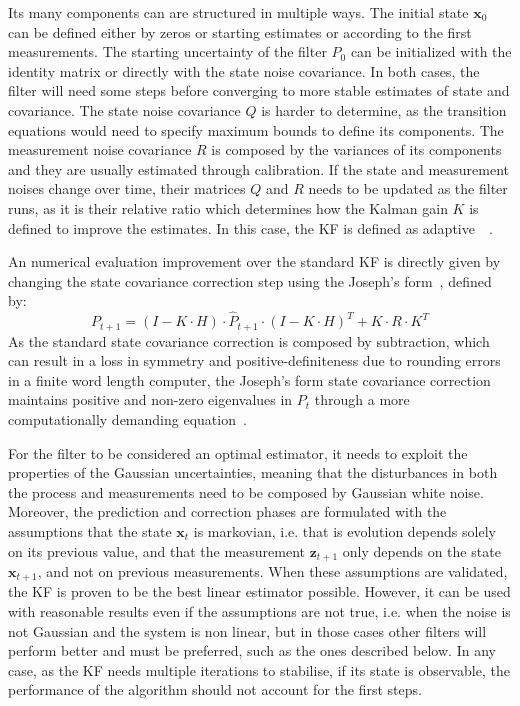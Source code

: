 Its many components can are structured in multiple ways.
The initial state $\mathbf{x}_{0}$ can be defined either by zeros or starting estimates or according to the first measurements.
The starting uncertainty of the filter $P_0$ can be initialized with the identity matrix or directly with the state noise covariance. In both cases, the filter will need some steps before converging to more stable estimates of state and covariance.
The state noise covariance $Q$ is harder to determine, as the transition equations would need to specify maximum bounds to define its components.
The measurement noise covariance $R$ is composed by the variances of its components and they are usually estimated through calibration.
If the state and measurement noises change over time, their matrices $Q$ and $R$ needs to be updated as the filter runs, as it is their relative ratio which determines how the Kalman gain $K$ is defined to improve the estimates. In this case, the \gls{KF} is defined as adaptive~\cite{adaptive}~\cite{1099422}.


An numerical evaluation improvement over the standard \gls{KF} is directly given by changing the state covariance correction step using the Joseph’s form~\cite{schmidt_analysis_2010}, defined by:
\begin{equation}
    P_{t+1} = (I - K \cdot H) \cdot \hat{P}_{t+1} \cdot (I - K \cdot H)^T + K \cdot R \cdot K^T
\end{equation}
As the standard state covariance correction is composed by subtraction, which can result in a loss in symmetry and positive-definiteness due to rounding errors in a finite word length computer, the Joseph’s form state covariance correction maintains positive and non-zero eigenvalues in $P_t$ through a more computationally demanding equation~\cite{BarShalom2001EstimationWA}.

For the filter to be considered an optimal estimator, it needs to exploit the properties of the Gaussian uncertainties, meaning that the disturbances in both the process and measurements need to be composed by Gaussian white noise.
Moreover, the prediction and correction phases are formulated with the assumptions that the state $\mathbf{x}_t$ is markovian, i.e. that is evolution depends solely on its previous value, and that the measurement $\mathbf{z}_{t+1}$ only depends on the state $\mathbf{x}_{t+1}$, and not on previous measurements.
When these assumptions are validated, the \gls{KF} is proven to be the best linear estimator possible.
However, it can be used with reasonable results even if the assumptions are not true, i.e. when the noise is not Gaussian and the system is non linear, but in those cases other filters will perform better and must be preferred, such as the ones described below.
In any case, as the \gls{KF} needs multiple iterations to stabilise, if its state is observable, the performance of the algorithm should not account for the first steps.

